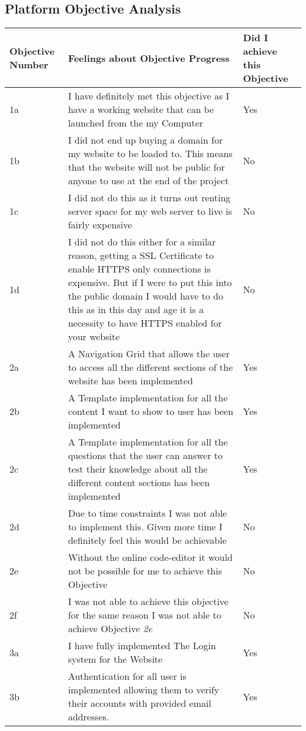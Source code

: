 \subsection{Platform Objective Analysis}
\begin{longtable}{|p{}|p{}|p{}|}
\toprule 
Objective Number & Feelings about Objective Progress & Did I achieve this Objective  \\
\midrule
1a & I have definitely met this objective as I have a working website that can be launched from the my Computer & Yes \\
\midrule
1b & I did not end up buying a domain for my website to be loaded to. This means that the website will not be public for anyone to use at the end of the project & No\\
\midrule
1c & I did not do this as it turns out renting server space for my web server to live is fairly expensive & No\\
\midrule
1d & I did not do this either for a similar reason, getting a SSL Certificate to enable HTTPS only connections is expensive. But if I were to put this into the public domain I would have to do this as in this day and age it is a necessity to have HTTPS enabled for your website & No\\
\midrule
2a & A Navigation Grid that allows the user to access all the different sections of the website has been implemented & Yes  \\
\midrule
2b & A Template implementation for all the content I want to show to user has been implemented & Yes \\
\midrule
2c & A Template implementation for all the questions that the user can answer to test their knowledge about all the different content sections has been implemented & Yes\\
\midrule
2d & Due to time constraints I was not able to implement this. Given more time I definitely feel this would be achievable & No \\
\midrule
2e & Without the online code-editor it would not be possible for me to achieve this Objective & No\\
\midrule
2f & I was not able to achieve this objective for the same reason I was not able to achieve Objective \textit{2e} & No \\
\midrule
3a & I have fully implemented The Login system for the Website & Yes\\
\midrule
3b & Authentication for all user is implemented allowing them to verify their accounts with provided email addresses. & Yes \\

\end{longtable}
